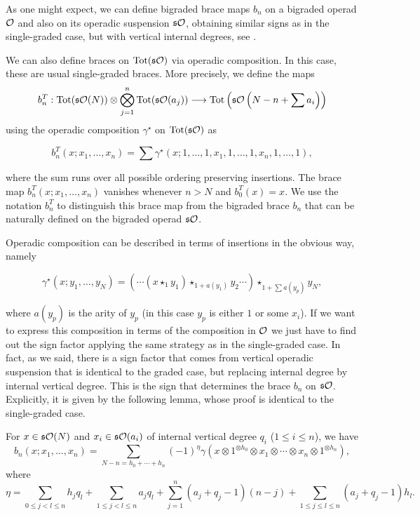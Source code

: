 \documentclass[Thesis.tex]{subfiles}
\begin{document}
As one might expect, we can define bigraded brace maps $b_n$ on a bigraded operad ${\mathcal O}$ and also on its operadic suspension $\mathfrak{s}{\mathcal O}$, obtaining similar signs as in the single-graded case, but with vertical internal degrees, see . 

We can also define braces on $\operatorname{Tot}(\mathfrak{s}{\mathcal O})$ via operadic composition. In this case, these are usual single-graded braces. More precisely, we define the maps 
\[b^T_n:\operatorname{Tot}(\mathfrak{s}{\mathcal O}(N))\otimes \bigotimes_{j=1}^n\operatorname{Tot}(\mathfrak{s}{\mathcal O}(a_j))\longrightarrow \operatorname{Tot}\left(\mathfrak{s}{\mathcal O}\left(N-n+\sum a_i\right)\right)\]
using the operadic composition $\gamma^\star$ on $\operatorname{Tot}(\mathfrak{s}{\mathcal O})$ as

\[b^T_n(x;x_1,\dots,x_n)=\sum\gamma^\star(x;1,\dots,1,x_1,1,\dots,1,x_n,1,\dots,1),\]

where the sum runs over all possible ordering preserving insertions. The brace map $b^T_n(x;x_1,\dots,x_n)$ vanishes whenever $n>N$ and $b^T_0(x)=x$. We use the notation $b^T_n$ to distinguish this brace map from the bigraded brace $b_n$ that can be naturally defined on the bigraded operad $\mathfrak{s}{\mathcal O}$.

Operadic composition can be described in terms of insertions in the obvious way, namely 

\begin{equation}\label{gammastar}
\gamma^\star(x;y_1,\dots,y_N)=(\cdots(x\star_1 y_1)\star_{1+a(y_1)}y_2\cdots)\star_{1+\sum a(y_p)}y_N,
\end{equation}

where $a(y_p)$ is the arity of $y_p$ (in this case $y_p$ is either $1$ or some $x_i$). If we want to express this composition in terms of the composition in ${\mathcal O}$ we just have to find out the sign factor applying the same strategy as in the single-graded case. In fact, as we said, there is a sign factor that comes from vertical operadic suspension that is identical to the graded case, but replacing internal degree by internal vertical degree. This is the sign that determines the brace $b_n$ on $\mathfrak{s}{\mathcal O}$. Explicitly, it is given by the following lemma, whose proof is identical to the single-graded case.
 
 \begin{lem}\label{bigradedsign}
For $x\in \mathfrak{s}{\mathcal O}(N)$ and $x_i\in\mathfrak{s}{\mathcal O}(a_i)$ of internal vertical degree $q_i$ ($1\leq i\leq n$), we have
\[b_n(x;x_1,\dots,x_n)=\sum_{N-n=h_0+\cdots+h_n} (-1)^\eta \gamma
(x\otimes 1^{\otimes h_0}\otimes x_1\otimes \cdots\otimes x_n\otimes1^{\otimes h_n}),\]
where 
\[\eta=\sum_{0\leq j<l\leq n}h_jq_l+\sum_{1\leq j<l\leq n}a_jq_l+\sum_{j=1}^n (a_j+q_j-1)(n-j)+\sum_{1\leq j\leq l\leq n} (a_j+q_j-1)h_l.\]
\end{lem}
\end{document}
